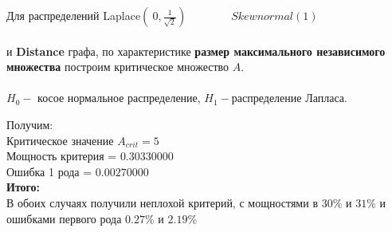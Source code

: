 \noindent Для распределений \qquad\qquad Laplace$(\ 0, \frac{1}{\sqrt{2}}) \qquad\qquad Skewnormal(1) $\\\\
и \textbf{Distance} графа, по характеристике \textbf{размер максимального независимого множества} построим критическое множество $A$.\\
\\
$H_0 - $ косое нормальное распределение, $H_1 - $распределение Лапласа.


\noindent Получим:\\
Критическое значение $A_{crit} = 5$\\
Мощность критерия = $0.30330000$\\
Ошибка 1 рода = $0.00270000$\\

\noindent \textbf{Итого:}\\
В обоих случаях получили неплохой критерий, с мощностями в $30\%$ и $31\%$  и ошибками первого рода $0.27\%$ и $2.19\%$